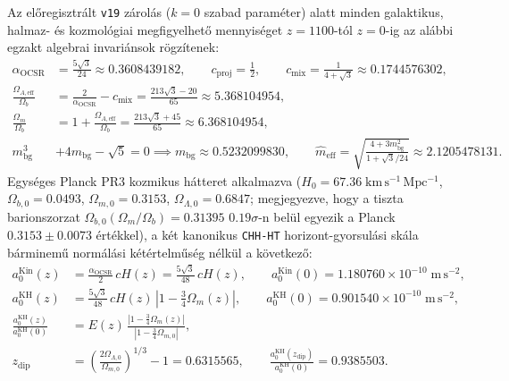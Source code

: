 \documentclass[11pt,a4paper]{article}
\begin{document}
Az előregisztrált \texttt{v19} zárolás ($k = 0$ szabad paraméter) alatt minden galaktikus, halmaz- és kozmológiai megfigyelhető mennyiséget $z = 1100$-tól $z = 0$-ig az alábbi egzakt algebrai invariánsok rögzítenek:
\begin{align}
  \alpha_{\mathrm{OCSR}} &= \frac{5\sqrt{3}}{24} \approx 0.3608439182, \qquad c_{\mathrm{proj}} = \frac{1}{2}, \qquad c_{\mathrm{mix}} = \frac{1}{4 + \sqrt{3}} \approx 0.1744576302, \label{eq:alpha_ocsr} \\
  \frac{\Omega_{A,\mathrm{eff}}}{\Omega_b} &= \frac{2}{\alpha_{\mathrm{OCSR}}} - c_{\mathrm{mix}} = \frac{213\sqrt{3} - 20}{65} \approx 5.368104954, \label{eq:omega_a_ratio} \\
  \frac{\Omega_m}{\Omega_b} &= 1 + \frac{\Omega_{A,\mathrm{eff}}}{\Omega_b} = \frac{213\sqrt{3} + 45}{65} \approx 6.368104954, \label{eq:omega_ratio} \\
  m_{\mathrm{bg}}^3 &+ 4 m_{\mathrm{bg}} - \sqrt{5} = 0 \implies m_{\mathrm{bg}} \approx 0.5232099830, \qquad
  \hat{m}_{\mathrm{eff}} = \sqrt{\frac{4 + 3 m_{\mathrm{bg}}^2}{1 + \sqrt{3}/24}} \approx 2.1205478131. \label{eq:m_eff_coca}
\end{align}
Egységes Planck PR3 kozmikus hátteret alkalmazva ($H_0 = 67.36\;\mathrm{km\,s^{-1}\,Mpc^{-1}}$, $\Omega_{b,0} = 0.0493$, $\Omega_{m,0} = 0.3153$, $\Omega_{\Lambda,0} = 0.6847$; megjegyezve, hogy a tiszta barionszorzat $\Omega_{b,0}(\Omega_m/\Omega_b) = 0.31395$ $0.19\sigma$-n belül egyezik a Planck $0.3153 \pm 0.0073$ értékkel), a két kanonikus \texttt{CHH-HT} horizont-gyorsulási skála bárminemű normálási kétértelműség nélkül a következő:
\begin{align}
  a_0^{\mathrm{Kin}}(z) &= \frac{\alpha_{\mathrm{OCSR}}}{2}\,c H(z) = \frac{5\sqrt{3}}{48}\,c H(z), \qquad
  a_0^{\mathrm{Kin}}(0) = 1.180760 \times 10^{-10}\;\mathrm{m\,s^{-2}}, \label{eq:a0_kin} \\
  a_0^{\mathrm{KH}}(z) &= \frac{5\sqrt{3}}{48}\,c H(z)\,\left|1 - \frac{3}{4}\Omega_m(z)\right|, \qquad
  a_0^{\mathrm{KH}}(0) = 0.901540 \times 10^{-10}\;\mathrm{m\,s^{-2}}, \label{eq:a0_kh} \\
  \frac{a_0^{\mathrm{KH}}(z)}{a_0^{\mathrm{KH}}(0)} &= E(z)\,\frac{\left|1 - \frac{3}{4}\Omega_m(z)\right|}{\left|1 - \frac{3}{4}\Omega_{m,0}\right|}, \label{eq:kh_norm} \\
  z_{\mathrm{dip}} &= \left(\frac{2\Omega_{\Lambda,0}}{\Omega_{m,0}}\right)^{1/3} - 1 = 0.6315565, \qquad
  \frac{a_0^{\mathrm{KH}}(z_{\mathrm{dip}})}{a_0^{\mathrm{KH}}(0)} = 0.9385503. \label{eq:zdip}
\end{align}
\end{document}

